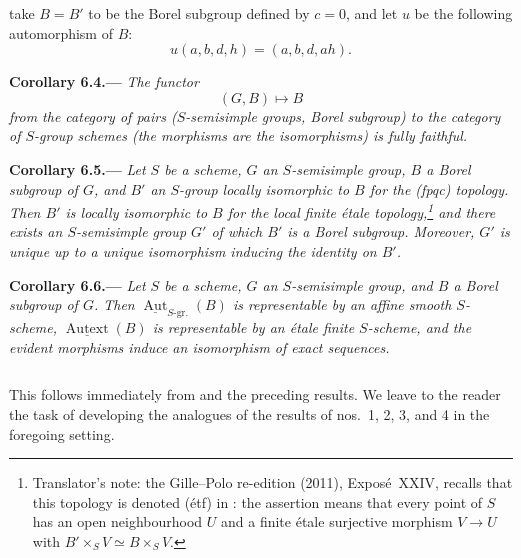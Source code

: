 

take \(B=B'\) to be the Borel subgroup defined by \(c=0\), and let \(u\)
be the following automorphism of \(B\):
\[
  u(a,b,d,h)=(a,b,d,ah).
\]

\par\medskip\noindent{}\textbf{Corollary 6.4.---}\enspace
\emph{The functor
\[
  (G,B)\longmapsto B
\]
from the category of pairs \textup{(}\(S\)-semisimple groups, Borel subgroup\textup{)} to the
category of \(S\)-group schemes \textup{(}the morphisms are the isomorphisms\textup{)} is
fully faithful.}

\par\medskip\noindent{}\textbf{Corollary 6.5.---}\enspace
\emph{Let \(S\) be a scheme, \(G\) an \(S\)-semisimple group, \(B\) a
Borel subgroup of \(G\), and \(B'\) an \(S\)-group locally isomorphic to
\(B\) for the \textup{(fpqc)} topology. Then \(B'\) is locally
isomorphic to \(B\) for the local finite étale
topology,\footnote{Translator's note: the Gille--Polo re-edition (2011), Exposé~XXIV, recalls that this topology is denoted \textup{(étf)} in
: the assertion means that every point of \(S\) has an open
neighbourhood \(U\) and a finite étale surjective morphism \(V\to U\) with
\(B'\times_SV\simeq B\times_SV\).} and there exists an
\(S\)-semisimple group \(G'\) of which \(B'\) is a Borel subgroup.
Moreover, \(G'\) is unique up to a unique isomorphism inducing the
identity on \(B'\).}

\par\medskip\noindent{}\textbf{Corollary 6.6.---}\enspace
\emph{Let \(S\) be a scheme, \(G\) an \(S\)-semisimple group, and \(B\)
a Borel subgroup of \(G\). Then
\(\underline{\operatorname{Aut}}_{S\text{-}\mathrm{gr.}}(B)\) is
representable by an affine smooth \(S\)-scheme,
\(\underline{\operatorname{Autext}}(B)\) is representable by an étale
finite \(S\)-scheme, and the evident morphisms induce an isomorphism of
exact sequences.}

\[
  
\]

This follows immediately from  and the preceding results. We leave
to the reader the task of developing the analogues of the results of
nos.~1, 2, 3, and 4 in the foregoing setting.

